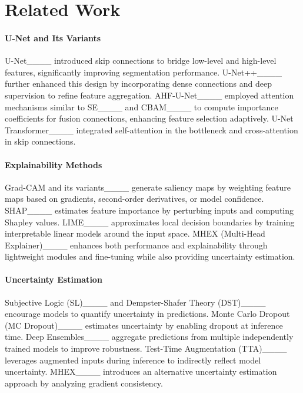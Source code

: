 \section{Related Work}
\paragraph{U-Net and Its Variants}  
U-Net____ introduced skip connections to bridge low-level and high-level features, significantly improving segmentation performance. U-Net++____ further enhanced this design by incorporating dense connections and deep supervision to refine feature aggregation. AHF-U-Net____ employed attention mechanisms similar to SE____ and CBAM____ to compute importance coefficients for fusion connections, enhancing feature selection adaptively. U-Net Transformer____ integrated self-attention in the bottleneck and cross-attention in skip connections.

\paragraph{Explainability Methods}  
Grad-CAM and its variants____ generate saliency maps by weighting feature maps based on gradients, second-order derivatives, or model confidence. SHAP____ estimates feature importance by perturbing inputs and computing Shapley values. LIME____ approximates local decision boundaries by training interpretable linear models around the input space. MHEX (Multi-Head Explainer)____ enhances both performance and explainability through lightweight modules and fine-tuning while also providing uncertainty estimation.  

\paragraph{Uncertainty Estimation}  
Subjective Logic (SL)____ and Dempster-Shafer Theory (DST)____ encourage models to quantify uncertainty in predictions. Monte Carlo Dropout (MC Dropout)____ estimates uncertainty by enabling dropout at inference time. Deep Ensembles____ aggregate predictions from multiple independently trained models to improve robustness. Test-Time Augmentation (TTA)____ leverages augmented inputs during inference to indirectly reflect model uncertainty. MHEX____ introduces an alternative uncertainty estimation approach by analyzing gradient consistency.